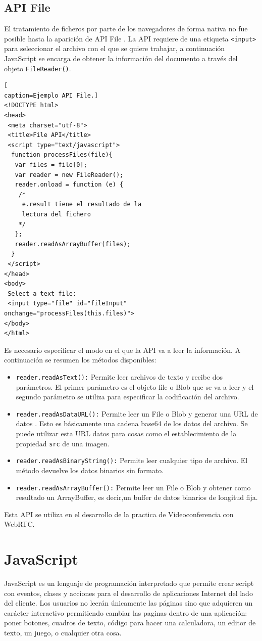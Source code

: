 \subsection{API File}
El tratamiento de ficheros por parte de los navegadores de forma nativa no fue posible hasta la aparición de API File \cite{APIFile}. La API requiere de una etiqueta \texttt{<input>} para seleccionar el archivo con el que se quiere trabajar, a continuación JavaScript se encarga de obtener la información del documento a través del objeto \texttt{FileReader()}.
\begin{lstlisting}[
caption=Ejemplo API File.]
<!DOCTYPE html>
<head>
 <meta charset="utf-8">
 <title>File API</title>
 <script type="text/javascript">
  function processFiles(file){
   var files = file[0];
   var reader = new FileReader();
   reader.onload = function (e) {
    /*
     e.result tiene el resultado de la 
     lectura del fichero
    */
   };
   reader.readAsArrayBuffer(files);
  }
 </script>
</head>
<body>
 Select a text file:
 <input type="file" id="fileInput" onchange="processFiles(this.files)">
</body>
</html>
\end{lstlisting}
Es necesario especificar el modo en el que la API va a leer la información. A continuación se resumen los métodos disponibles:
\begin{itemize}
\item \texttt{reader.readAsText():} Permite leer archivos de texto y recibe dos parámetros. El primer parámetro es el objeto file o Blob que se va a leer y el segundo parámetro se utiliza para especificar la codificación del archivo.
\item \texttt{reader.readAsDataURL():} Permite leer un File o Blob y generar una URL de datos . Esto es básicamente una cadena base64 de los datos del archivo. Se puede utilizar esta URL datos para cosas como el establecimiento de la propiedad \texttt{src} de una imagen.
\item \texttt{reader.readAsBinaryString():} Permite leer cualquier tipo de archivo. El método devuelve los datos binarios sin formato.
\item \texttt{reader.readAsArrayBuffer():} Permite leer un File o Blob y obtener como resultado un ArrayBuffer, es decir,un buffer de datos binarios de longitud fija.
\end{itemize}
Esta API se utiliza en el desarrollo de la practica de Videoconferencia con WebRTC.
\section{JavaScript}
JavaScript \cite{javascript} es un lenguaje de programación interpretado que permite crear script con eventos, clases y acciones para el desarrollo de aplicaciones Internet del lado del cliente. Los usuarios no leerán únicamente las páginas sino que adquieren un carácter interactivo permitiendo cambiar las paginas dentro de una aplicación: poner botones, cuadros de texto, código para hacer una calculadora, un editor de texto, un juego, o cualquier otra cosa.
